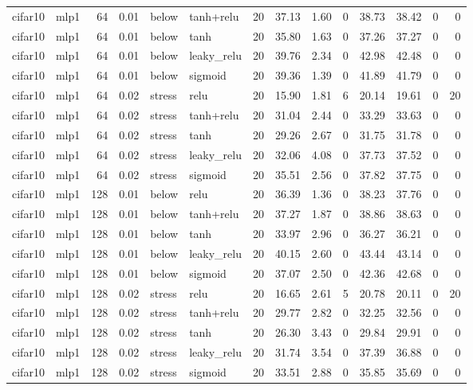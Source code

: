 \begin{table}[htbp]
{\begin{tabular}{@{}llrrllrrrrrrrr@{}}
cifar10 & mlp1 & 64 & 0.01 & below & tanh+relu & 20 & 37.13 & 1.60 & 0 & 38.73 & 38.42 & 0 & 0 \\
cifar10 & mlp1 & 64 & 0.01 & below & tanh & 20 & 35.80 & 1.63 & 0 & 37.26 & 37.27 & 0 & 0 \\
cifar10 & mlp1 & 64 & 0.01 & below & leaky\_relu & 20 & 39.76 & 2.34 & 0 & 42.98 & 42.48 & 0 & 0 \\
cifar10 & mlp1 & 64 & 0.01 & below & sigmoid & 20 & 39.36 & 1.39 & 0 & 41.89 & 41.79 & 0 & 0 \\
cifar10 & mlp1 & 64 & 0.02 & stress & relu & 20 & 15.90 & 1.81 & 6 & 20.14 & 19.61 & 0 & 20 \\
cifar10 & mlp1 & 64 & 0.02 & stress & tanh+relu & 20 & 31.04 & 2.44 & 0 & 33.29 & 33.63 & 0 & 0 \\
cifar10 & mlp1 & 64 & 0.02 & stress & tanh & 20 & 29.26 & 2.67 & 0 & 31.75 & 31.78 & 0 & 0 \\
cifar10 & mlp1 & 64 & 0.02 & stress & leaky\_relu & 20 & 32.06 & 4.08 & 0 & 37.73 & 37.52 & 0 & 0 \\
cifar10 & mlp1 & 64 & 0.02 & stress & sigmoid & 20 & 35.51 & 2.56 & 0 & 37.82 & 37.75 & 0 & 0 \\
cifar10 & mlp1 & 128 & 0.01 & below & relu & 20 & 36.39 & 1.36 & 0 & 38.23 & 37.76 & 0 & 0 \\
cifar10 & mlp1 & 128 & 0.01 & below & tanh+relu & 20 & 37.27 & 1.87 & 0 & 38.86 & 38.63 & 0 & 0 \\
cifar10 & mlp1 & 128 & 0.01 & below & tanh & 20 & 33.97 & 2.96 & 0 & 36.27 & 36.21 & 0 & 0 \\
cifar10 & mlp1 & 128 & 0.01 & below & leaky\_relu & 20 & 40.15 & 2.60 & 0 & 43.44 & 43.14 & 0 & 0 \\
cifar10 & mlp1 & 128 & 0.01 & below & sigmoid & 20 & 37.07 & 2.50 & 0 & 42.36 & 42.68 & 0 & 0 \\
cifar10 & mlp1 & 128 & 0.02 & stress & relu & 20 & 16.65 & 2.61 & 5 & 20.78 & 20.11 & 0 & 20 \\
cifar10 & mlp1 & 128 & 0.02 & stress & tanh+relu & 20 & 29.77 & 2.82 & 0 & 32.25 & 32.56 & 0 & 0 \\
cifar10 & mlp1 & 128 & 0.02 & stress & tanh & 20 & 26.30 & 3.43 & 0 & 29.84 & 29.91 & 0 & 0 \\
cifar10 & mlp1 & 128 & 0.02 & stress & leaky\_relu & 20 & 31.74 & 3.54 & 0 & 37.39 & 36.88 & 0 & 0 \\
cifar10 & mlp1 & 128 & 0.02 & stress & sigmoid & 20 & 33.51 & 2.88 & 0 & 35.85 & 35.69 & 0 & 0 \\

\end{tabular}}
\end{table}
